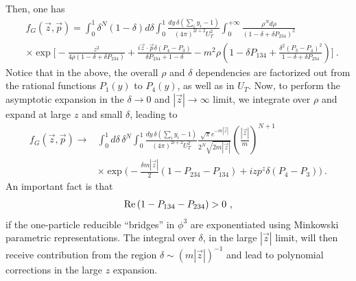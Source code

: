 \documentclass[a4paper,11pt]{article}
\begin{document}
Then, one has
\begin{align}
&f_G\left(\vec{z},\vec{p}\right)=\int_0^1 \delta^N(1-\delta)d\delta\int_0^1\frac{dy \, \delta(\sum_i y_i-1)}{(4\pi)^{2l+2}U_T^2}\int_0^{+\infty}\frac{\rho^Nd\rho}{(1-\delta+\delta P_{234})^2} \nonumber \\ 
&\times \exp\bigg[ -\frac{z^2}{4\rho(1-\delta+\delta P_{234})}+\frac{i\vec{z}\cdot\vec{p}\delta(P_4-P_3)}{\delta P_{234}+1-\delta}-m^2\rho\left(1-\delta P_{134}+\frac{\delta^2(P_3-P_4)^2}{1-\delta+\delta P_{234}}\right)\bigg] \ . 
\end{align}
Notice that in the above, the overall $\rho$ and $\delta$ dependencies are factorized out from the rational functions $P_1(y)$ to $P_4(y)$, as well as in $U_T$.
Now, to perform the asymptotic expansion in the $\delta \rightarrow 0$ and $|\vec{z}| \rightarrow \infty$ limit, we integrate over $\rho$ and expand at large $z$ and small $\delta$, leading to
\begin{align}\label{eq:fGLz&Sd}
f_G\left(\vec{z},\vec{p}\right)  \rightarrow &\int_0^1 d\delta \, \delta^N \int_0^1\frac{dy \, \delta(\sum_i y_i-1)}{(4\pi)^{2l+2}U_T^2} \frac{\sqrt{\pi}e^{-m|\vec{z}|}}{2^N\sqrt{2m|\vec{z}|}}\left(\frac{|\vec{z}|}{m}\right)^{N+1} \nonumber\\
&\times \exp \bigg(-\frac{\delta m|\vec{z}|}{2}(1-P_{234}-P_{134})+izp^z \delta(P_4-P_3)\bigg) \ . 
\end{align} 
An important fact is that
\begin{align}
{\rm Re} \left(1-P_{134}-P_{234}\right)>0  \ , 
\end{align}
if the one-particle reducible ``bridges'' in $\phi^3$ are exponentiated using Minkowski parametric representations. The integral over $\delta$, in the large $|\vec{z}|$ limit, will then receive contribution from the region $\delta \sim (m|\vec{z}|)^{-1}$ and lead to polynomial corrections in the large $z$ expansion. 
\end{document}
